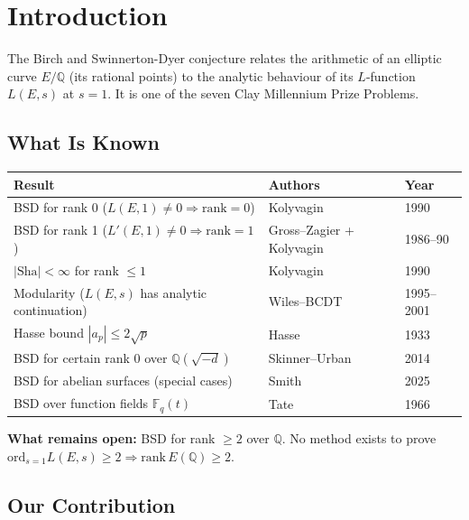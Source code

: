 \documentclass[11pt,a4paper]{article}
\theoremstyle{plain}
\theoremstyle{definition}
\theoremstyle{remark}
\begin{document}
\tableofcontents
\newpage

\section{Introduction}

The Birch and Swinnerton-Dyer conjecture relates the arithmetic of an elliptic curve $E/\mathbb{Q}$ (its rational points) to the analytic behaviour of its $L$-function $L(E,s)$ at $s = 1$. It is one of the seven Clay Millennium Prize Problems.

\subsection{What Is Known}

\begin{center}\small
\begin{tabular}{lll}
\toprule
Result & Authors & Year \\
\midrule
BSD for rank 0 ($L(E,1) \neq 0 \Rightarrow \text{rank} = 0$) & Kolyvagin & 1990 \\
BSD for rank 1 ($L'(E,1) \neq 0 \Rightarrow \text{rank} = 1$) & Gross--Zagier + Kolyvagin & 1986--90 \\
$|\text{Sha}| < \infty$ for rank $\leq 1$ & Kolyvagin & 1990 \\
Modularity ($L(E,s)$ has analytic continuation) & Wiles--BCDT & 1995--2001 \\
Hasse bound $|a_p| \leq 2\sqrt{p}$ & Hasse & 1933 \\
BSD for certain rank 0 over $\mathbb{Q}(\sqrt{-d})$ & Skinner--Urban & 2014 \\
BSD for abelian surfaces (special cases) & Smith & 2025 \\
BSD over function fields $\mathbb{F}_q(t)$ & Tate & 1966 \\
\bottomrule
\end{tabular}
\end{center}

\textbf{What remains open:} BSD for rank $\geq 2$ over $\mathbb{Q}$. No method exists to prove $\text{ord}_{s=1} L(E,s) \geq 2 \Rightarrow \text{rank}\,E(\mathbb{Q}) \geq 2$.

\subsection{Our Contribution}
\end{document}
